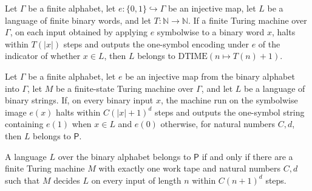 \begin{theorem}
\label{Complexity.mem_DTIME_of_decidesInTimeVia}
\leanok
{}
Let $\Gamma$ be a finite alphabet, let $e:\{0,1\}\hookrightarrow\Gamma$ be an injective
map, let $L$ be a language of finite binary words, and let $T:\mathbb N\to\mathbb N$. If
a finite Turing machine over $\Gamma$, on each input obtained by applying $e$ symbolwise
to a binary word $x$, halts within $T(|x|)$ steps and outputs the one-symbol encoding
under $e$ of the indicator of whether $x\in L$, then $L$ belongs to
$\mathrm{DTIME}(n\mapsto T(n)+1)$.
\end{theorem}

\begin{theorem}
\label{Complexity.mem_P_of_decidesInTimeVia_poly}
\leanok
{}
Let $\Gamma$ be a finite alphabet, let $e$ be an injective map from the binary alphabet
into $\Gamma$, let $M$ be a finite-state Turing machine over $\Gamma$, and let $L$ be a
language of binary strings. If, on every binary input $x$, the machine run on the
symbolwise image $e(x)$ halts within $C(|x|+1)^d$ steps and outputs the one-symbol
string containing $e(1)$ when $x\in L$ and $e(0)$ otherwise, for natural numbers $C,d$,
then $L$ belongs to $\mathsf{P}$.
\end{theorem}

\begin{theorem}
\label{Complexity.mem_P_iff_one_work_tape}
\leanok
{}
A language $L$ over the binary alphabet belongs to $\mathsf{P}$ if and only if there are
a finite Turing machine $M$ with exactly one work tape and natural numbers $C,d$ such
that $M$ decides $L$ on every input of length $n$ within $C(n+1)^d$ steps.
\end{theorem}
